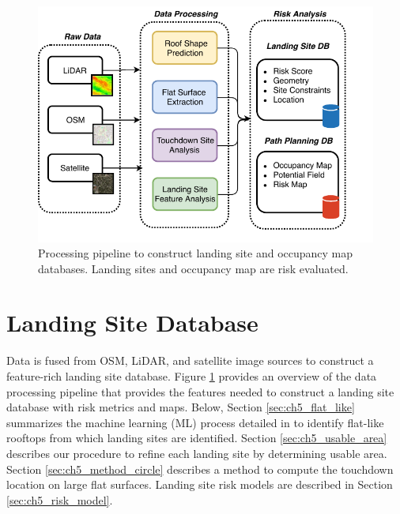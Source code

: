 \begin{figure}[!t]
    \centering
    \includegraphics[clip, trim=0.0cm 0cm 0cm 0cm, width=0.7\linewidth]{chapter_5_mapping/imgs/data_preprocessing-Page-1.pdf}
    \caption[Processing pipeline to construct landing site and occupancy map databases]{Processing pipeline to construct landing site and occupancy map databases. Landing sites and occupancy map are risk evaluated.}
    \label{fig:ch5_overview_processing}
\end{figure}

\section{Landing Site Database}\label{sec:ch5_landing_site_database}

 Data is fused from OSM, LiDAR, and satellite image sources to construct a feature-rich landing site database. Figure \ref{fig:ch5_overview_processing} provides an overview of the data processing pipeline that provides the features needed to construct a landing site database with risk metrics and maps.
Below, Section \ref{sec:ch5_flat_like} summarizes the machine learning (ML) process detailed in \cite{castagno_comprehensive_2018} to identify flat-like rooftops from which landing sites are identified. Section \ref{sec:ch5_usable_area} describes our procedure to refine each landing site by determining usable area. Section \ref{sec:ch5_method_circle} describes a method to compute the touchdown location on large flat surfaces. Landing site risk models are described in Section \ref{sec:ch5_risk_model}.

